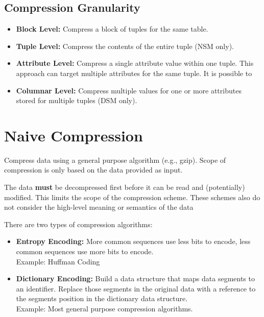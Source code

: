 \documentclass[11pt]{article}
\begin{document}
\subsection*{Compression Granularity}
\begin{itemize}
    \item \textbf{Block Level:}
    Compress a block of tuples for the same table.
    
    \item \textbf{Tuple Level:}
    Compress the contents of the entire tuple (NSM only).
    
    \item \textbf{Attribute Level:}
    Compress a single attribute value within one tuple. This approach can target multiple attributes 
    for the same tuple. It is possible to 
    
    \item \textbf{Columnar Level:}
    Compress multiple values for one or more attributes stored for multiple tuples (DSM only).
\end{itemize}

\section{Naive Compression}
Compress data using a general purpose algorithm (e.g., gzip). Scope of compression is only 
based on the data provided as input.

The data \textbf{must} be decompressed first before it can be read and (potentially) 
modified. This limits the scope of the compression scheme. These schemes also do not consider the 
high-level meaning or semantics of the data

There are two types of compression algorithms:
\begin{itemize}
    \item \textbf{Entropy Encoding:}
    More common sequences use less bits to encode, less common 
    sequences use more bits to encode. \\
    Example: Huffman Coding
    
    \item \textbf{Dictionary Encoding:}
    Build a data structure that maps data segments to an identifier. Replace those 
    segments in the original data with a reference to the segments position in the dictionary data 
    structure. \\
    Example: Most general purpose compression algorithms.
\end{itemize}
\end{document}
